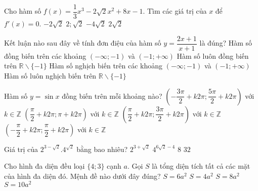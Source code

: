 \begin{ex}%
Cho hàm số $f(x)=\dfrac{1}{3}x^3-2\sqrt{2}x^2+8x-1$. Tìm các giá trị của $x$ để $f'(x)=0$.
	\choice
	{${-2\sqrt{2}}$}
	{${2;\sqrt{2}}$}
	{${-4\sqrt{2}}$}
	{\True ${2\sqrt{2}}$}
\end{ex}
\begin{ex}%
Kết luận nào sau đây về tính đơn điệu của hàm số $y=\dfrac{2x+1}{x+1}$ là đúng?
	\choice
	{\True Hàm số đồng biến trên các khoảng $(-\infty;-1)$ và $(-1;+\infty)$}
	{Hàm số luôn đồng biến trên $\mathbb{R}\backslash  \{-1\}$}
	{Hàm số nghịch biến trên các khoảng $(-\infty;-1)$ và $(-1;+\infty)$}
	{Hàm số luôn nghịch biến trên $\mathbb{R}\backslash  \{-1\}$}
\end{ex}
\begin{ex}%
Hàm số $y=\sin x$ đồng biến trên mỗi khoảng nào?
	\choice
{$\left(-\dfrac{3\pi}{2}+k2\pi;\dfrac{5\pi}{2}+k2\pi\right)$ với $k\in \mathbb{Z}$}
{$\left(\dfrac{\pi}{2}+k2\pi;\pi+k2\pi\right)$ với $k\in \mathbb{Z}$}
{$\left(\dfrac{\pi}{2}+k2\pi;\dfrac{3\pi}{2}+k2\pi\right)$ với $k\in \mathbb{Z}$}
{\True $\left(-\dfrac{\pi}{2}+k2\pi;\dfrac{\pi}{2}+k2\pi\right)$ với $k\in \mathbb{Z}$}
\end{ex}
\begin{ex}%
Giá trị của $2^{3-\sqrt{2}}.4^{\sqrt{2}}$ bằng bao nhiêu?
	\choice
	{\True $2^{3+\sqrt{2}}$}
	{$4^{6\sqrt{2}-4}$}
	{$8$}
	{$32$}
\end{ex}
\begin{ex}%
Cho hình đa diện đều loại $\{4;3\}$ cạnh $a$. Gọi $S$ là tổng diện tích tất cả các mặt của hình đa diện đó. Mệnh đề nào dưới đây đúng?
	\choice
	{\True $S=6a^2$}
	{$S=4a^2$}
	{$S=8a^2$}
	{$S=10a^2$}
\end{ex}
